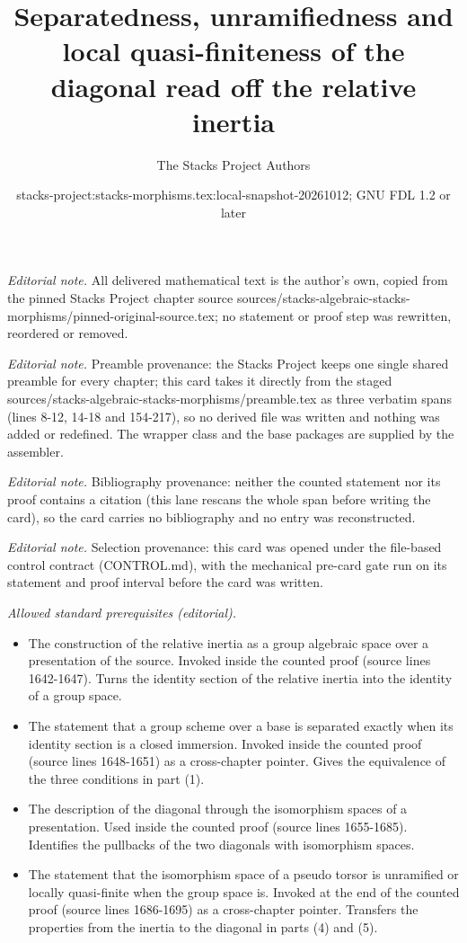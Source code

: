 \documentclass[10pt,a4paper]{amsart}
\title{Separatedness, unramifiedness and local quasi-finiteness of the diagonal read off the relative inertia}
\author{The Stacks Project Authors}
\date{stacks-project:stacks-morphisms.tex:local-snapshot-20261012; GNU FDL 1.2 or later}
\theoremstyle{plain}
\theoremstyle{definition}
\theoremstyle{remark}
\numberwithin{equation}{subsection}
\begin{document}
\maketitle
\noindent\textit{Editorial note.} All delivered mathematical text is the author's own, copied from the pinned Stacks Project chapter source sources/stacks-algebraic-stacks-morphisms/pinned-original-source.tex; no statement or proof step was rewritten, reordered or removed.\par\medskip
\noindent\textit{Editorial note.} Preamble provenance: the Stacks Project keeps one single shared preamble for every chapter; this card takes it directly from the staged sources/stacks-algebraic-stacks-morphisms/preamble.tex as three verbatim spans (lines 8-12, 14-18 and 154-217), so no derived file was written and nothing was added or redefined. The wrapper class and the base packages are supplied by the assembler.\par\medskip
\noindent\textit{Editorial note.} Bibliography provenance: neither the counted statement nor its proof contains a citation (this lane rescans the whole span before writing the card), so the card carries no bibliography and no entry was reconstructed.\par\medskip
\noindent\textit{Editorial note.} Selection provenance: this card was opened under the file-based control contract (CONTROL.md), with the mechanical pre-card gate run on its statement and proof interval before the card was written.\par\medskip
\noindent\textit{Allowed standard prerequisites (editorial).}\begin{itemize}
\item The construction of the relative inertia as a group algebraic space over a presentation of the source. Invoked inside the counted proof (source lines 1642-1647). Turns the identity section of the relative inertia into the identity of a group space.
\item The statement that a group scheme over a base is separated exactly when its identity section is a closed immersion. Invoked inside the counted proof (source lines 1648-1651) as a cross-chapter pointer. Gives the equivalence of the three conditions in part (1).
\item The description of the diagonal through the isomorphism spaces of a presentation. Used inside the counted proof (source lines 1655-1685). Identifies the pullbacks of the two diagonals with isomorphism spaces.
\item The statement that the isomorphism space of a pseudo torsor is unramified or locally quasi-finite when the group space is. Invoked at the end of the counted proof (source lines 1686-1695) as a cross-chapter pointer. Transfers the properties from the inertia to the diagonal in parts (4) and (5).
\end{itemize}\medskip
\end{document}
